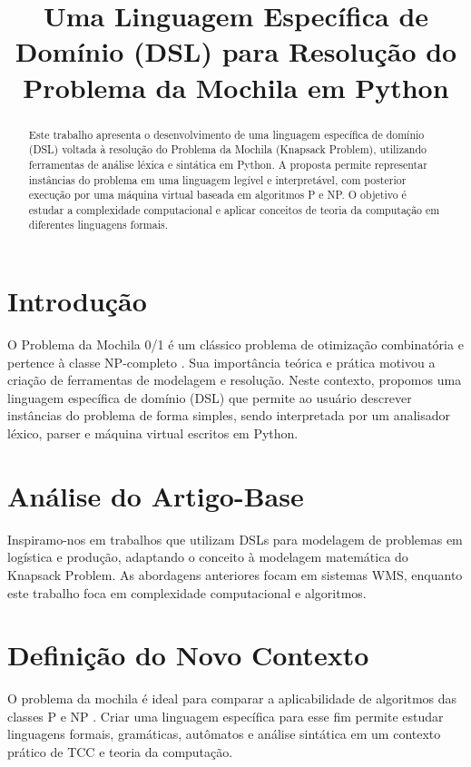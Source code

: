 \documentclass[conference]{IEEEtran}
\title{Uma Linguagem Específica de Domínio (DSL) para Resolução do Problema da Mochila em Python}
\author{
    \IEEEauthorblockN{Guilherme Cavenaghi - 109317,
    Rafael Godoy - 110453,
    Rafael Pereira de Souza - 109680}
    \IEEEauthorblockA{Centro Universitário FHO\\
    \{guilherme.cavenaghi, rafagodoy330, r.souza\}@alunos.fho.edu.br}
}
\begin{document}
\maketitle

\begin{abstract}
Este trabalho apresenta o desenvolvimento de uma linguagem específica de domínio (DSL) voltada à resolução do Problema da Mochila (Knapsack Problem), utilizando ferramentas de análise léxica e sintática em Python. A proposta permite representar instâncias do problema em uma linguagem legível e interpretável, com posterior execução por uma máquina virtual baseada em algoritmos P e NP. O objetivo é estudar a complexidade computacional e aplicar conceitos de teoria da computação em diferentes linguagens formais.
\end{abstract}

\section{Introdução}
O Problema da Mochila 0/1 é um clássico problema de otimização combinatória e pertence à classe NP-completo \cite{martello1990knapsack}. Sua importância teórica e prática motivou a criação de ferramentas de modelagem e resolução. Neste contexto, propomos uma linguagem específica de domínio (DSL) que permite ao usuário descrever instâncias do problema de forma simples, sendo interpretada por um analisador léxico, parser e máquina virtual escritos em Python.

\section{Análise do Artigo-Base}
Inspiramo-nos em trabalhos que utilizam DSLs para modelagem de problemas em logística e produção, adaptando o conceito à modelagem matemática do Knapsack Problem. As abordagens anteriores focam em sistemas WMS, enquanto este trabalho foca em complexidade computacional e algoritmos.

\section{Definição do Novo Contexto}
O problema da mochila é ideal para comparar a aplicabilidade de algoritmos das classes P e NP \cite{cormen2022algorithms}. Criar uma linguagem específica para esse fim permite estudar linguagens formais, gramáticas, autômatos e análise sintática em um contexto prático de TCC e teoria da computação.
\end{document}
